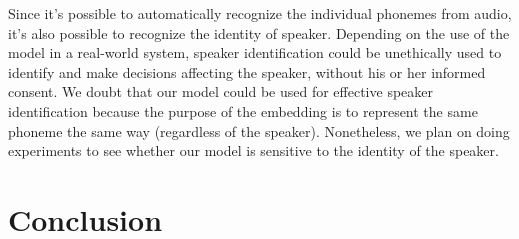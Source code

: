 \documentclass{article}
\begin{document}
Since it's possible to automatically recognize the individual phonemes from audio, it's also possible to recognize the identity of speaker. Depending on the use of the model in a real-world system, speaker identification could be unethically used to identify and make decisions affecting the speaker, without his or her informed consent. We doubt that our model could be used for effective speaker identification because the purpose of the embedding is to represent the same phoneme the same way (regardless of the speaker). Nonetheless, we plan on doing experiments to see whether our model is sensitive to the identity of the speaker.


\section{Conclusion}
\end{document}
